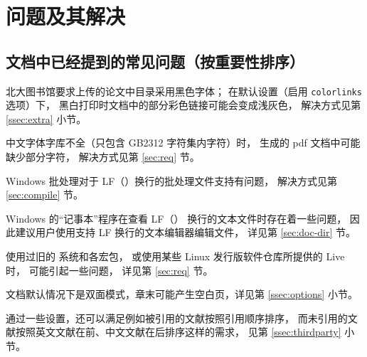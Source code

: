 %
%
%
%
%

\chapter{问题及其解决}
	\section{文档中已经提到的常见问题（按重要性排序）}

	北大图书馆要求上传的论文中目录采用黑色字体；
	在默认设置（启用 \verb|colorlinks| 选项）下，
	黑白打印时文档中的部分彩色链接可能会变成浅灰色，
	解决方式见第 \ref{ssec:extra} 小节。

	中文字体字库不全（只包含 GB2312 字符集内字符）时，
	生成的 pdf 文档中可能缺少部分字符，
	解决方式见第 \ref{sec:req} 节。

	Windows 批处理对于 LF（\texttt{\string\n}）换行的批处理文件支持有问题，
	解决方式见第 \ref{sec:compile} 节。

	Windows 的“记事本”程序在查看 LF（\texttt{\string\n}）
	换行的文本文件时存在着一些问题，
	因此建议用户使用支持 LF 换行的文本编辑器编辑文件，
	详见第 \ref{sec:doc-dir} 节。

	使用过旧的  系统和各宏包，
	或使用某些 Linux 发行版软件仓库所提供的 Live 时，
	可能引起一些问题，
	详见第 \ref{sec:req} 节。

	文档默认情况下是双面模式，章末可能产生空白页，详见第 \ref{ssec:options} 小节。

	通过一些设置，还可以满足例如被引用的文献按照引用顺序排序，
	而未引用的文献按照英文文献在前、中文文献在后排序这样的需求，
	见第 \ref{ssec:thirdparty} 小节。

